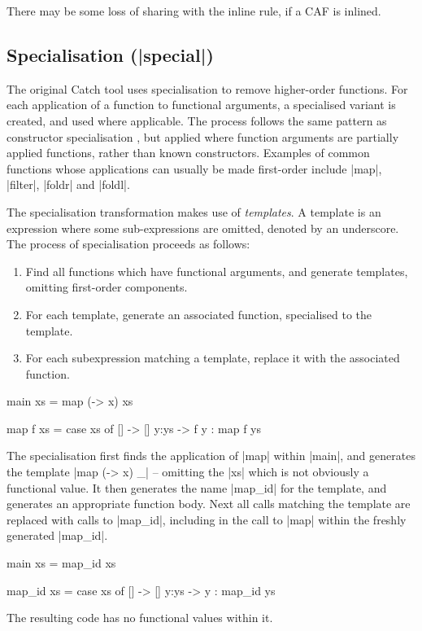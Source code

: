 \documentclass[preprint]{sigplanconf}
\begin{document}
There may be some loss of sharing with the inline rule, if a CAF is inlined.

\subsection{Specialisation (|special|)}

The original Catch tool \cite{me:catch_tfp} uses specialisation to remove higher-order functions. For each application of a function to functional arguments, a specialised variant is created, and used where applicable. The process follows the same pattern as constructor specialisation \cite{spj:specconstr}, but applied where function arguments are partially applied functions, rather than known constructors. Examples of common functions whose applications can usually be made first-order include |map|, |filter|, |foldr| and |foldl|.

The specialisation transformation makes use of \textit{templates}. A template is an expression where some sub-expressions are omitted, denoted by an underscore. The process of specialisation proceeds as follows:

\begin{enumerate}
\item Find all functions which have functional arguments, and generate templates, omitting first-order components.
\item For each template, generate an associated function, specialised to the template.
\item For each subexpression matching a template, replace it with the associated function.
\end{enumerate}

\begin{example}
\begin{code}
main xs = map (\x -> x) xs

map f xs = case  xs of
                 []    -> []
                 y:ys  -> f y : map f ys
\end{code}

The specialisation first finds the application of |map| within |main|, and generates the template |map (\x -> x) _| -- omitting the |xs| which is not obviously a functional value. It then generates the name |map_id| for the template, and generates an appropriate function body. Next all calls matching the template are replaced with calls to |map_id|, including in the call to |map| within the freshly generated |map_id|.

\begin{code}
main xs = map_id xs

map_id xs = case  xs of
                  []    -> []
                  y:ys  -> y : map_id ys
\end{code}

The resulting code has no functional values within it.
\end{example}
\end{document}
